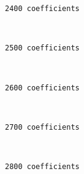     \begin{Verbatim}[commandchars=\\\{\}]
2400 coefficients
    \end{Verbatim}

    \begin{center}
    \end{center}
    { \hspace*{\fill} \\}
    
    \begin{Verbatim}[commandchars=\\\{\}]
2500 coefficients
    \end{Verbatim}

    \begin{center}
    \end{center}
    { \hspace*{\fill} \\}
    
    \begin{Verbatim}[commandchars=\\\{\}]
2600 coefficients
    \end{Verbatim}

    \begin{center}
    \end{center}
    { \hspace*{\fill} \\}
    
    \begin{Verbatim}[commandchars=\\\{\}]
2700 coefficients
    \end{Verbatim}

    \begin{center}
    \end{center}
    { \hspace*{\fill} \\}
    
    \begin{Verbatim}[commandchars=\\\{\}]
2800 coefficients
    \end{Verbatim}

    \begin{center}
    \end{center}
    { \hspace*{\fill} \\}
    
